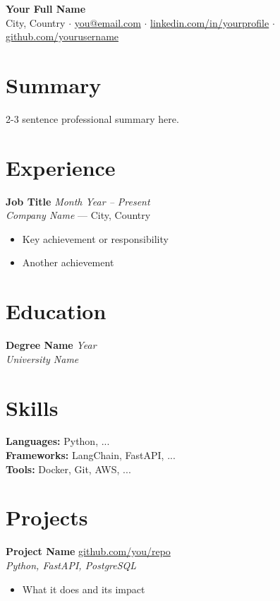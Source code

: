 \documentclass[11pt, a4paper]{article}
\begin{document}
\begin{center}
    {\LARGE \textbf{Your Full Name}}\\[4pt]
    City, Country
    $\cdot$
    \href{mailto:you@email.com}{you@email.com}
    $\cdot$
    \href{https://linkedin.com/in/yourprofile}{linkedin.com/in/yourprofile}
    $\cdot$
    \href{https://github.com/yourusername}{github.com/yourusername}
\end{center}

\section*{Summary}
2-3 sentence professional summary here.

\section*{Experience}
\textbf{Job Title} \hfill \textit{Month Year -- Present}\\
\textit{Company Name} — City, Country
\begin{itemize}[noitemsep, topsep=2pt]
    \item Key achievement or responsibility
    \item Another achievement
\end{itemize}

\section*{Education}
\textbf{Degree Name} \hfill \textit{Year}\\
\textit{University Name}

\section*{Skills}
\textbf{Languages:} Python, ...\\
\textbf{Frameworks:} LangChain, FastAPI, ...\\
\textbf{Tools:} Docker, Git, AWS, ...

\section*{Projects}
\textbf{Project Name} \hfill \href{https://github.com/you/repo}{github.com/you/repo}\\
\textit{Python, FastAPI, PostgreSQL}
\begin{itemize}[noitemsep, topsep=2pt]
    \item What it does and its impact
\end{itemize}
\end{document}
